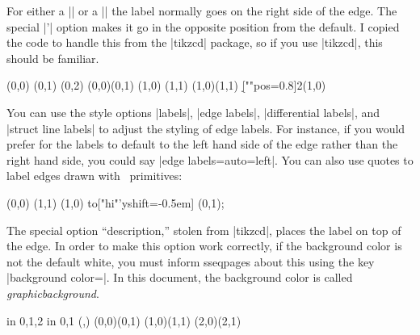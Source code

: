 \documentclass{ltxdoc}
\newenvironment{manualentry}[1]{
    \begin{pgfmanualentry}
    \pgfmanualentryheadline{#1}
    \pgfmanualbody
}{
    \end{pgfmanualentry}
}
\begin{document}
\begin{sseqdata}[name=ex1,degree={#1}{1-#1}]
\begin{manualentry}{\pgfmanualpdflabel{""quotes}{}|"|\meta{text}|"|\opt{\meta{options}}}
For either a |\structline| or a |\class| the label normally goes on the right side of the edge. The special |'| option makes it go in the opposite position from the default. I copied the code to handle this from the |tikzcd| package, so if you use |tikzcd|, this should be familiar.
\begin{codeexample}[]
\begin{sseqpage}
\class(0,0)
\class(0,1)
\class(0,2)
\structline["a"' blue](0,0)(0,1)
\class(1,0)
\class(1,1)
\structline["b"](1,0)(1,1)
\d[""{pos=0.8}]2(1,0)
\end{sseqpage}
\end{codeexample}
You can use the style options |labels|, |edge labels|, |differential labels|, and |struct line labels| to adjust the styling of edge labels. For instance, if you would prefer for the labels to default to the left hand side of the edge rather than the right hand side, you could say |edge labels={auto=left}|.
You can also use quotes to label edges drawn with \tikzname\ primitives:
\begin{codeexample}[]
\begin{sseqpage}
\class(0,0) \class(1,1)
\draw (1,0) to["hi"'{yshift=-0.5em}] (0,1);
\end{sseqpage}
\end{codeexample}
The special option ``description,'' stolen from |tikzcd|, places the label on top of the edge. In order to make this option work correctly, if the background color is not the default white, you must inform sseqpages about this using the key |background color=|. In this document, the background color is called \textit{graphicbackground}.
\begin{codeexample}[]
\begin{sseqpage}[no axes,background color=graphicbackground]
\foreach\x in {0,1,2} \foreach\y in {0,1}{
    \class(\x,\y)
}
\structline["a" red](0,0)(0,1)
\structline["a'"'blue,"b"{yshift=1em}](1,0)(1,1)
\structline["c" description](2,0)(2,1)
\end{sseqpage}
\end{codeexample}
\end{manualentry}




\end{sseqdata}
\end{document}
